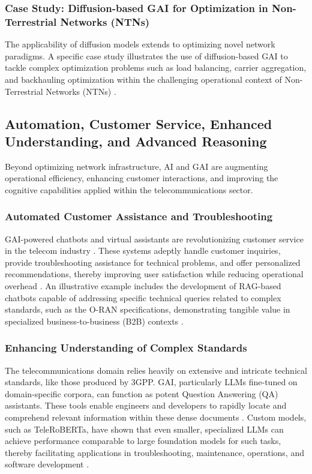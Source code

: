 \documentclass[sigconf]{acmart}
\begin{document}
\subsubsection{Case Study: Diffusion-based GAI for Optimization in Non-Terrestrial Networks (NTNs)} \label{subsubsec:dm_ntn}
The applicability of diffusion models extends to optimizing novel network paradigms. A specific case study illustrates the use of diffusion-based GAI to tackle complex optimization problems such as load balancing, carrier aggregation, and backhauling optimization within the challenging operational context of Non-Terrestrial Networks (NTNs) \cite{ref9}.

\subsection{Automation, Customer Service, Enhanced Understanding, and Advanced Reasoning}
\label{subsec:automation_reasoning}

Beyond optimizing network infrastructure, AI and GAI are augmenting operational efficiency, enhancing customer interactions, and improving the cognitive capabilities applied within the telecommunications sector.

\subsubsection{Automated Customer Assistance and Troubleshooting} \label{subsubsec:customer_service}
GAI-powered chatbots and virtual assistants are revolutionizing customer service in the telecom industry \cite{ref2}. These systems adeptly handle customer inquiries, provide troubleshooting assistance for technical problems, and offer personalized recommendations, thereby improving user satisfaction while reducing operational overhead \cite{ref2}. An illustrative example includes the development of RAG-based chatbots capable of addressing specific technical queries related to complex standards, such as the O-RAN specifications, demonstrating tangible value in specialized business-to-business (B2B) contexts \cite{ref2}.

\subsubsection{Enhancing Understanding of Complex Standards} \label{subsubsec:standards_understanding}
The telecommunications domain relies heavily on extensive and intricate technical standards, like those produced by 3GPP. GAI, particularly LLMs fine-tuned on domain-specific corpora, can function as potent Question Answering (QA) assistants. These tools enable engineers and developers to rapidly locate and comprehend relevant information within these dense documents \cite{ref18}. Custom models, such as TeleRoBERTa, have shown that even smaller, specialized LLMs can achieve performance comparable to large foundation models for such tasks, thereby facilitating applications in troubleshooting, maintenance, operations, and software development \cite{ref18}.
\end{document}
